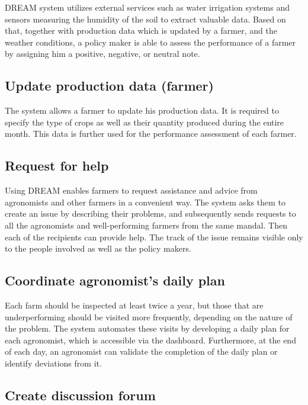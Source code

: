 DREAM system utilizes external services such as water irrigation systems and sensors measuring the humidity of the soil to extract valuable data. Based on that, together with production data which is updated by a farmer, and the weather conditions, a policy maker is able to assess the performance of a farmer by assigning him a positive, negative, or neutral note.

\subsection{Update production data (farmer)}

The system allows a farmer to update his production data. It is required to specify the type of crops as well as their quantity produced during the entire month. This data is further used for the performance assessment of each farmer.

\subsection{Request for help}

Using DREAM enables farmers to request assistance and advice from agronomists and other farmers in a convenient way. The system asks them to create an issue by describing their problems, and subsequently sends  requests to all the agronomists and well-performing farmers from the same mandal. Then each of the recipients can provide help. The track of the issue remains visible only to the people involved as well as the policy makers.

\subsection{Coordinate agronomist's daily plan}

Each farm should be inspected at least twice a year, but those that are underperforming should be visited more frequently, depending on the nature of the problem. The system automates these visits by developing a daily plan for each agronomist, which is accessible via the dashboard. Furthermore, at the end of each day, an agronomist can validate the completion of the daily plan or identify deviations from it.

\subsection{Create discussion forum}

